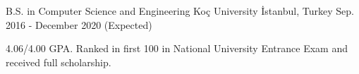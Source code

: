 
\vspace*{-1.5mm}

\begin{cventries}
 \cventry
    {B.S. in Computer Science and Engineering}
    {Koç University}
    {İstanbul, Turkey}
    {Sep. 2016 - December 2020 (Expected)}
    {
      \begin{cvitems}
	\item {4.06/4.00 GPA. Ranked in first 100 in National University Entrance Exam and received full scholarship.}
      \end{cvitems}
    }
\end{cventries}
